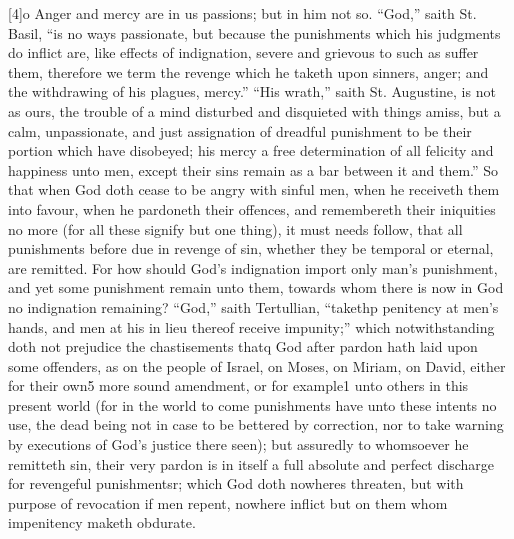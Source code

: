 [4]o Anger and mercy are in us passions; but in him not so. “God,” saith St. Basil, “is no ways passionate, but because the punishments which his judgments do inflict are, like effects of indignation, severe and grievous to such as suffer them, therefore we term the revenge which he taketh upon sinners, anger; and the withdrawing of his plagues, mercy.” “His wrath,” saith St. Augustine, is not as ours, the trouble of a mind disturbed and disquieted with things amiss, but a calm, unpassionate, and just assignation of dreadful punishment to be their portion which have disobeyed; his mercy a free determination of all felicity and happiness unto men, except their sins remain as a bar between it and them.” So that when God doth cease to be angry with sinful men, when he receiveth them into favour, when he pardoneth their offences, and remembereth their iniquities no more (for all these signify but one thing), it must needs follow, that all punishments before due in revenge of sin, whether they be temporal or eternal, are remitted. For how should God’s indignation import only man’s punishment, and yet some punishment remain unto them, towards whom there is now in God no indignation remaining? “God,” saith Tertullian, “takethp penitency at men’s hands, and men at his in lieu thereof receive impunity;” which notwithstanding doth not prejudice the chastisements thatq God after pardon hath laid upon some offenders, as on the people of Israel, on Moses, on Miriam, on David, either for their own5 more sound amendment, or  for example1 unto others in this present world (for in the world to come punishments have unto these intents no use, the dead being not in case to be bettered by correction, nor to take warning by executions of God’s justice there seen); but assuredly to whomsoever he remitteth sin, their very pardon is in itself a full absolute and perfect discharge for revengeful punishmentsr; which God doth nowheres threaten, but with purpose of revocation if men repent, nowhere inflict but on them whom impenitency maketh obdurate.

